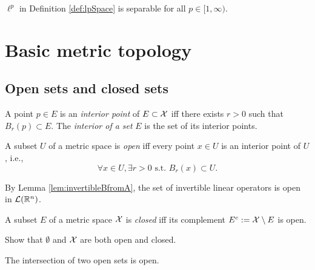 \begin{lem}
  \label{lem:ellPisSeparable}
  $\ell^p$ in Definition \ref{def:lpSpace} 
  is separable for all $p\in[1,\infty)$.
\end{lem}

\section{Basic metric topology}
\label{sec:metric-topology}

\subsection{Open sets and closed sets}
\label{sec:open-sets-closed}

\begin{defn}
  \label{def:interiorPoint}
  A point $p\in E$ is an \emph{interior point} of $E\subset {\cal X}$
  iff there exists $r>0$ such that $B_r(p)\subset E$.
  The \emph{interior of a set} $E$
  is the set of its interior points.
\end{defn}

\begin{defn}
  \label{def:openSetInMetricSpace}
  A subset $U$ of a metric space is \emph{open} iff
  every point $x\in U$ is an interior point of $U$, i.e., 
  \begin{displaymath}
    \forall x\in U, \exists r>0 \text{ s.t. }
    B_r(x)\subset U.
  \end{displaymath}
\end{defn}

\begin{exm}
  \label{exm:invertibleOpSetIsOpen}
  By Lemma \ref{lem:invertibleBfromA},
  the set of invertible linear operators is open
  in ${\cal L}(\mathbb{R}^n)$.
\end{exm}

\begin{defn}
  \label{def:closedSets}
  A subset $E$ of a metric space ${\cal X}$ is \emph{closed}
  iff its complement $E^c:={\cal X}\setminus E$ is open.
\end{defn}

\begin{exc}
  Show that $\emptyset$ and ${\cal X}$
  are both open and closed.
\end{exc}

\begin{lem}
  \label{lem:intersectionOpenSets}
  The intersection of two open sets is open.
\end{lem}

